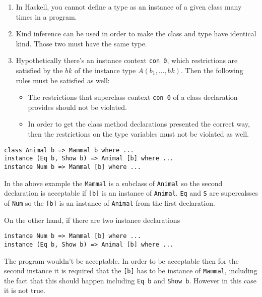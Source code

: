 \documentclass[a4paper, titlepage, twoside]{article}
\begin{document}
\begin{enumerate}
\item In Haskell, you cannot define a type as an instance of a given class many times in a program.

\item Kind inference can be used in order to make the class and type have identical kind. Those two must have the same type.

\item Hypothetically there’s an instance context \texttt{con 0}, which restrictions are satisfied by the \(b_{}k\) of the instance type \(A(b_1, \dots, b_{}k)\). Then the following rules must be satisfied as well:

\begin{itemize}
\item The restrictions that superclass context \texttt{con 0} of a class declaration provides should not be violated.

\item In order to get the class method declarations presented the correct way, then the restrictions on the type variables must not be violated as well.
\end{itemize}
\end{enumerate}

\begin{verbatim}
class Animal b => Mammal b where ...
instance (Eq b, Show b) => Animal [b] where ...
instance Num b => Mammal [b] where ...
\end{verbatim}

In the above example the \texttt{Mammal} is a subclass of \texttt{Animal} so the second declaration is acceptable if \texttt{[b]} is an instance of \texttt{Animal}. \texttt{Eq} and \texttt{S} are supercalsses of \texttt{Num} so the \texttt{[b]} is an instance of \texttt{Animal} from the first declaration.

On the other hand, if there are two instance declarations

\begin{verbatim}
instance Num b => Mammal [b] where ...
instance (Eq b, Show b) => Animal [b] where ...
\end{verbatim}

The program wouldn't be acceptable. In order to be acceptable then for the second instance it is required that the \texttt{[b]} has to be instance of \texttt{Mammal}, including the fact that this should happen including \texttt{Eq b} and \texttt{Show b}. However in this case it is not true.
\end{document}
